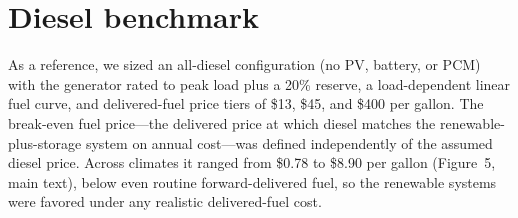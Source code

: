 \documentclass[11pt]{article}
\begin{document}
\section{Diesel benchmark}\label{sec:diesel}
As a reference, we sized an all-diesel configuration (no PV, battery, or PCM) with the generator
rated to peak load plus a 20\% reserve, a load-dependent linear fuel curve, and delivered-fuel price
tiers of \$13, \$45, and \$400 per gallon. The break-even fuel price---the delivered price at which
diesel matches the renewable-plus-storage system on annual cost---was defined independently of the
assumed diesel price. Across climates it ranged from \$0.78 to \$8.90 per gallon (Figure~5, main text), below even routine forward-delivered fuel, so the renewable systems were favored under any
realistic delivered-fuel cost.




\end{document}
